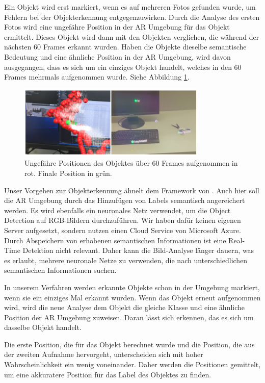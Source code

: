 Ein Objekt wird erst markiert, wenn es auf mehreren Fotos gefunden wurde, um Fehlern bei der Objekterkennung entgegenzuwirken. Durch die Analyse des ersten Fotos wird eine ungefähre Position in der AR Umgebung für das Objekt ermittelt. Dieses Objekt wird dann mit den Objekten verglichen, die während der nächsten 60 Frames erkannt wurden. Haben die Objekte dieselbe semantische Bedeutung und eine ähnliche Position in der AR Umgebung, wird davon ausgegangen, dass es sich um ein einziges Objekt handelt, welches in den 60 Frames mehrmals aufgenommen wurde. Siehe Abbildung \ref{img:60frames}.

\begin{figure}[H]
	\centering
	\includegraphics[width=0.8\textwidth]{images/img_huynh.PNG}
	\caption[Objekterkennung von \cite{LabelingLanguageLearning}]{Ungefähre Positionen des Objektes über 60 Frames aufgenommen in rot. Finale Position in grün.\citep{LabelingLanguageLearning}}
	\label{img:60frames}
\end{figure}

Unser Vorgehen zur Objekterkennung ähnelt dem Framework von \cite{LabelingLanguageLearning}. Auch hier soll die AR Umgebung durch das Hinzufügen von Labels semantisch angereichert werden. Es wird ebenfalls ein neuronales Netz verwendet, um die Object Detection auf RGB-Bildern durchzuführen. Wir haben dafür keinen eigenen Server aufgesetzt, sondern nutzen einen Cloud Service von Microsoft Azure. Durch Abspeichern von erhobenen semantischen Informationen ist eine Real-Time Detektion nicht relevant. Daher kann die Bild-Analyse länger dauern, was es erlaubt, mehrere neuronale Netze zu verwenden, die nach unterschiedlichen semantischen Informationen suchen.

In unserem Verfahren werden erkannte Objekte schon in der Umgebung markiert, wenn sie ein einziges Mal erkannt wurden. Wenn das Objekt erneut aufgenommen wird, wird die neue Analyse dem Objekt die gleiche Klasse und eine ähnliche Position der AR Umgebung zuweisen. Daran lässt sich erkennen, das es sich um dasselbe Objekt handelt.

Die erste Position, die für das Objekt berechnet wurde und die Position, die aus der zweiten Aufnahme hervorgeht, unterscheiden sich mit hoher Wahrscheinlichkeit ein wenig voneinander. Daher werden die Positionen gemittelt, um eine akkuratere Position für das Label des Objektes zu finden. 
\citep{LabelingLanguageLearning}

